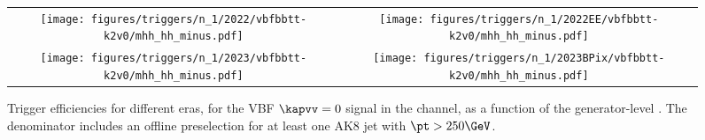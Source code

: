 
    \begin{figure}[H]
        \centering
        \begin{tabular}{cc}
            \texttt{[image: figures/triggers/n\_1/2022/vbfbbtt-k2v0/mhh\_hh\_minus.pdf]} &
            \texttt{[image: figures/triggers/n\_1/2022EE/vbfbbtt-k2v0/mhh\_hh\_minus.pdf]} \\[1ex]
            \texttt{[image: figures/triggers/n\_1/2023/vbfbbtt-k2v0/mhh\_hh\_minus.pdf]} &
            \texttt{[image: figures/triggers/n\_1/2023BPix/vbfbbtt-k2v0/mhh\_hh\_minus.pdf]}
            \label{fig}
        \end{tabular}
\caption{Trigger efficiencies for different eras, for the VBF \HHbbtt $\kapvv=0$ signal in the \tauhh channel, as a function of the generator-level \mHH. The denominator includes an offline preselection for at least one AK8 jet with $\pt > 250\GeV$.}
\label{fig:triggers_n-1_vbfbbtt-k2v0_hh_mhh}
\end{figure}
